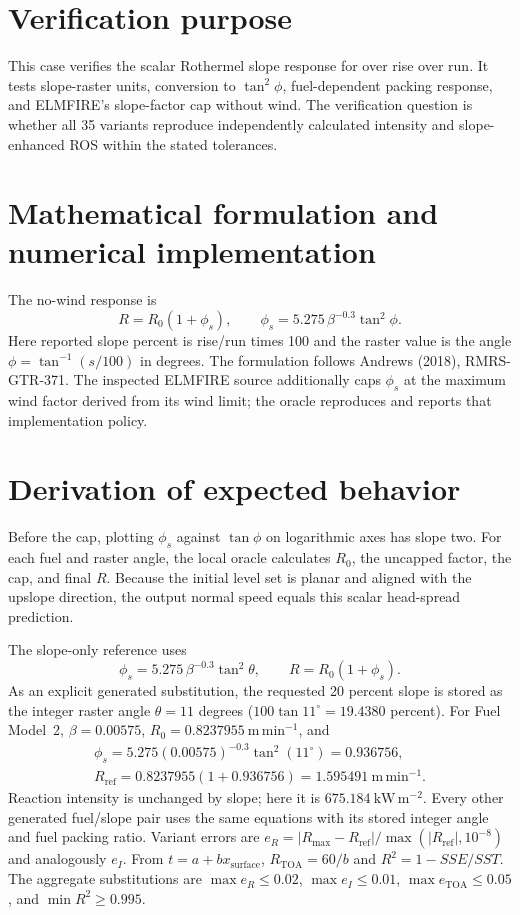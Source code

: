\section{Verification purpose}
This case verifies the scalar Rothermel slope response for \FuelSet{} over \SlopeSet{} rise over run.  It tests slope-raster units, conversion to $\tan^2\phi$, fuel-dependent packing response, and ELMFIRE's slope-factor cap without wind.  The verification question is whether all 35 variants reproduce independently calculated intensity and slope-enhanced ROS within the stated tolerances.

\section{Mathematical formulation and numerical implementation}
The no-wind response is
\begin{equation}R=R_0(1+\phi_s),\qquad \phi_s=5.275\,\beta^{-0.3}\tan^2\phi .\end{equation}
Here reported slope percent is rise/run times 100 and the raster value is the angle $\phi=\tan^{-1}(s/100)$ in degrees.  The formulation follows Andrews (2018), RMRS-GTR-371.  The inspected ELMFIRE source additionally caps $\phi_s$ at the maximum wind factor derived from its wind limit; the oracle reproduces and reports that implementation policy.

\section{Derivation of expected behavior}
Before the cap, plotting $\phi_s$ against $\tan\phi$ on logarithmic axes has slope two.  For each fuel and raster angle, the local oracle calculates $R_0$, the uncapped factor, the cap, and final $R$.  Because the initial level set is planar and aligned with the upslope direction, the output normal speed equals this scalar head-spread prediction.

The slope-only reference uses
\[
 \phi_s=5.275\,\beta^{-0.3}\tan^2\theta,\qquad
 R=R_0(1+\phi_s).
\]
As an explicit generated substitution, the requested 20 percent slope is
stored as the integer raster angle \(\theta=11\) degrees
(\(100\tan11^\circ=19.4380\) percent).  For Fuel Model~2,
\(\beta=0.00575\), \(R_0=0.8237955~\mathrm{m\,min^{-1}}\), and
\[
 \begin{gathered}\phi_s=5.275(0.00575)^{-0.3}\tan^2(11^\circ)=0.936756,\\
 R_{\mathrm{ref}}=0.8237955(1+0.936756)
 =1.595491~\mathrm{m\,min^{-1}}.\end{gathered}
\]
Reaction intensity is unchanged by slope; here it is
\(675.184~\mathrm{kW\,m^{-2}}\).  Every other generated fuel/slope pair
uses the same equations with its stored integer angle and fuel packing
ratio.  Variant errors are
\(e_R=|R_{\max}-R_{\mathrm{ref}}|/\max(|R_{\mathrm{ref}}|,10^{-8})\)
and analogously \(e_I\).  From \(t=a+bx_{\mathrm{surface}}\),
\(R_{\mathrm{TOA}}=60/b\) and \(R^2=1-SSE/SST\).
The aggregate substitutions are \(\max e_R\leq0.02\),
\(\max e_I\leq0.01\), \(\max e_{\mathrm{TOA}}\leq0.05\), and
\(\min R^2\geq0.995\).

